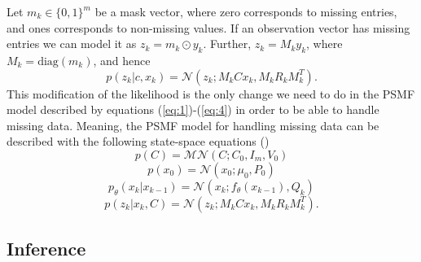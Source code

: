 \documentclass{mldsmsc}
\begin{document}
Let $m_k \in \{0,1\}^m$ be a mask vector, where zero corresponds to missing entries, and ones corresponds to non-missing values. If an observation vector has missing entries we can model it as $z_k = m_k \odot y_k$. Further, $z_k = M_k y_k$, where $M_k = \text{diag}(m_k)$, and hence
\begin{equation}
    p(z_k | c, x_k) = \mathcal{N}(z_k; M_k Cx_k, M_k R_k M_{k}^{T}).
\end{equation}
This modification of the likelihood is the only change we need to do in the PSMF model described by equations (\ref{eq:1})-(\ref{eq:4}) in order to be able to handle missing data. Meaning, the PSMF model for handling missing data can be described with the following state-space equations (\cite{akyildiz2021probabilistic})
\begin{equation}
    p(C) = \mathcal{MN}(C; C_0, I_m, V_0)
\end{equation}
\begin{equation}
    p(x_0) = \mathcal{N}(x_0; \mu_0, P_0)
\end{equation}
\begin{equation}
    p_{\theta}(x_k | x_{k-1}) = \mathcal{N}(x_k; f_{\theta}(x_{k-1}), Q_k)
\end{equation}
\begin{equation}
    p(z_k | x_k, C) = \mathcal{N}(z_k; M_k Cx_k, M_k R_k M_{k}^{T}).
\end{equation}

\subsection{Inference}
\end{document}
